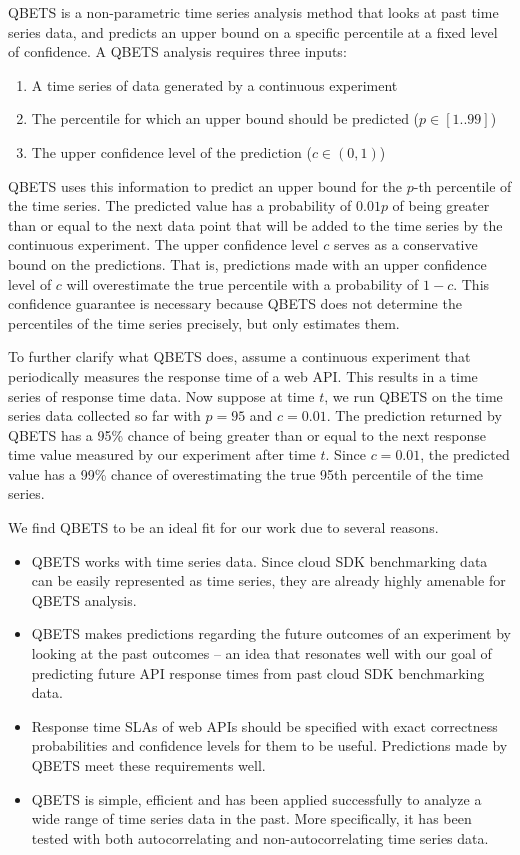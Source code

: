 QBETS is a non-parametric time series analysis method that looks at past time series data, and predicts
an upper bound on a specific percentile at a fixed level of confidence. A QBETS analysis requires three inputs:

\begin{enumerate}
\item A time series of data generated by a continuous experiment
\item The percentile for which an upper bound should be predicted ($p \in [1..99]$)
\item The upper confidence level of the prediction ($c \in (0,1)$)
\end{enumerate}

QBETS uses this information to predict an upper bound for the $p$-th percentile of the time series.
The predicted value has a probability of $0.01p$ of being greater than or equal to the next data point that
will be added to the time series by the continuous experiment. 
The upper confidence level $c$ serves as a conservative
bound on the predictions. That is, predictions made with an upper confidence level of $c$ will overestimate
the true percentile with a probability of $1-c$. This confidence guarantee is necessary because 
QBETS does not determine the 
percentiles of the time series precisely, but only estimates them. 

To further clarify what QBETS does, assume a continuous experiment that periodically measures the
response time of a web API. This results in a time series of response time data. Now suppose at time $t$,
we run QBETS on the time series data collected so far with $p=95$ and $c=0.01$. The prediction returned
by QBETS has a 95\% chance of being greater than or equal to the next response time value measured
by our experiment after time $t$. Since $c=0.01$, the predicted value has a 99\% chance of
overestimating the true 95th percentile of the time series.

We find QBETS to be an ideal fit for our work due to several reasons. 
\begin{itemize}
\item QBETS works with time series data. Since
cloud SDK benchmarking data can be easily represented as time series,
they are already highly amenable for QBETS analysis. 
\item QBETS makes predictions regarding the
future outcomes of an experiment by looking at the past outcomes -- an idea that resonates well with our
goal of predicting future API response times from past cloud SDK benchmarking data. 
\item Response time
SLAs of web APIs should be specified with exact correctness probabilities and confidence levels for
them to be useful. Predictions made by QBETS meet these requirements well. 
\item QBETS is 
simple, efficient and has been applied successfully to analyze a wide range of time series data in the past.
More specifically, it has been tested with both autocorrelating and non-autocorrelating time series data.
\end{itemize}

